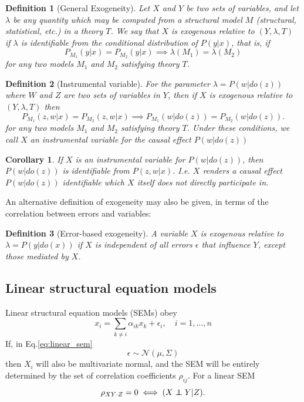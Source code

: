 \documentclass[11pt]{article}
\numberwithin{equation}{section}
\newcommand\indep{\protect\mathpalette{\protect\independenT}{\perp}}
\def\independenT#1#2{\mathrel{\rlap{$#1#2$}\mkern2mu{#1#2}}}
\newtheorem{defn}{Definition}[section]
\newtheorem{cor}{Corollary}[section]
\begin{document}
\begin{defn}[General Exogeneity]
Let $X$ and $Y$ be two sets of variables, and let $\lambda$ be any quantity which may be computed from a structural model $M$ (structural, statistical, etc.) in a theory $T$. We say that $X$ is exogenous relative to $(Y, \lambda ,T)$ if $\lambda$ is identifiable from the conditional distribution of $P(y|x)$, that is, if
\begin{equation}
P_{M_1}(y|x) = P_{M_2}(y|x) \implies \lambda(M_1) = \lambda(M_2)
\end{equation}
for any two models $M_1$ and $M_2$ satisfying theory $T$. \label{def:general-exog}
\end{defn}


\begin{defn}[Instrumental variable]
For the parameter $\lambda = P(w|do(z))$ where $W$ and $Z$ are two sets of variables in $Y$, then if $X$ is exogenous relative to $(Y, \lambda, T)$ then
\begin{equation}
P_{M_1}(z,w|x) = P_{M_2}(z,w|x) \implies P_{M_1}(w|do(z)) = P_{M_2}(w|do(z)).
\end{equation}
for any two models $M_1$ and $M_2$ satisfying theory $T$. Under these conditions, we call $X$ an instrumental variable for the causal effect $P(w|do(z))$
\end{defn}

\begin{cor}
If $X$ is an instrumental variable for $P(w|do(z))$, then $P(w|do(z))$ is identifiable from $P(z,w|x)$. I.e. $X$ renders a causal effect $P(w|do(z))$ identifiable which $X$ itself does not directly participate in.
\end{cor}

An alternative definition of exogeneity may also be given, in terms of the correlation between errors and variables:
\begin{defn}[Error-based exogeneity]
A variable $X$ is exogenous relative to $\lambda=P(y|do(x))$ if $X$ is independent of all errors $\epsilon$ that influence $Y$, except those mediated by $X$. 
\end{defn}

\subsection{Linear structural equation models}

Linear structural equation models (SEMs) obey
\begin{equation}
x_i = \sum_{k \neq i} \alpha_{ik} x_k + \epsilon_i, \quad i=1,...,n  \label{eq:linear_sem}
\end{equation}
If, in Eq.\eqref{eq:linear_sem} 
\begin{equation}
\epsilon \sim \mathcal{N}(\mu, \Sigma)
\end{equation}
then $X_i$ will also be multivariate normal, and the SEM will be entirely determined by the set of correlation coefficients $\rho_{ij}$. For a linear SEM
\begin{equation}
\rho_{XY\cdot Z} = 0 \iff (X \indep Y | Z).
\end{equation}
\end{document}

